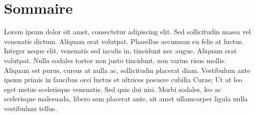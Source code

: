\chapter*{Sommaire}

\raggedbottom

\onehalfspacing
\setcounter{footnote}{0}
\renewcommand{\thefootnote}{\arabic{footnote}}

Lorem  ipsum dolor sit amet, consectetur adipiscing elit. Sed sollicitudin massa vel venenatis dictum. Aliquam erat volutpat. Phasellus accumsan eu felis at luctus. Integer neque elit, venenatis sed iaculis in, tincidunt nec augue. Aliquam erat volutpat. Nulla sodales tortor non justo tincidunt, non varius risus mollis. Aliquam est purus, cursus at nulla ac, sollicitudin placerat diam. Vestibulum ante ipsum primis in faucibus orci luctus et ultrices posuere cubilia Curae; Ut at leo eget metus scelerisque venenatis. Sed quis dui nisi. Morbi sodales, leo ac scelerisque malesuada, libero sem placerat ante, sit amet ullamcorper ligula nulla vestibulum tellus.



